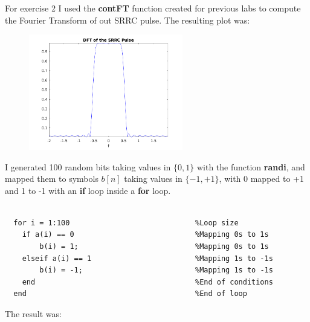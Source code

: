 \documentclass[a4paper,11pt]{article}
\begin{document}
For exercise 2 I used the \textbf{contFT} function created for previous labs
to compute the Fourier Transform of out SRRC pulse. The resulting plot was:

\begin{figure}[!hp]
    \begin{center}
      \includegraphics[width=0.6\textwidth]{images/exercise2.png}
    \end{center}
\end{figure}

\newpage

I generated 100 random bits taking values in $\{0, 1\}$ with the function
\textbf{randi}, and mapped them to symbols $b[n]$ taking values in $\{-1, +1\}$,
with 0 mapped to +1 and 1 to -1 with an \textbf{if} loop inside a \textbf{for}
loop.

\bigskip

\begin{lstlisting}

  for i = 1:100                             %Loop size
    if a(i) == 0                            %Mapping 0s to 1s
        b(i) = 1;                           %Mapping 0s to 1s
    elseif a(i) == 1                        %Mapping 1s to -1s
        b(i) = -1;                          %Mapping 1s to -1s
    end                                     %End of conditions
  end                                       %End of loop

\end{lstlisting}

\bigskip

The result was:
\end{document}
